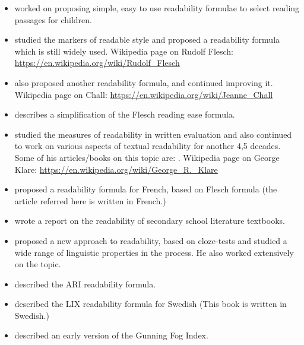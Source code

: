 \documentclass[a4paper,12pt]{report}
\begin{document}
\begin{itemize}
\item \cite{Lorge-39,Lorge-44,Thorndike.Lorge-44} worked on proposing simple, easy to use readability formulae to select reading passages for children.

\item \cite{Flesch-43,Flesch-48} studied the markers of readable style and proposed a readability formula which is still widely used. Wikipedia page on Rudolf Flesch: \url{https://en.wikipedia.org/wiki/Rudolf_Flesch}

\item \cite{Dale.Chall-48,Dale.Chall-48a} also proposed another readability formula, and continued improving it. Wikipedia page on Chall: \url{https://en.wikipedia.org/wiki/Jeanne_Chall}

\item \cite{Farr.Jenkins.ea-51} describes a simplification of the Flesch reading ease formula.

\item \cite{Klare-52} studied the measures of readability in written evaluation and also continued to work on various aspects of textual readability for another 4,5 decades. Some of his articles/books on this topic are: \cite{Klare.Mabry.ea-55a,Klare.Mabry.ea-55b,Klare.Nichols.ea-57,Klare-63,Klare-69,Klare-74,Klare-00,Klare-00a}. Wikipedia page on George Klare: \url{https://en.wikipedia.org/wiki/George_R._Klare}

\item \cite{Kandel.Moles-58} proposed a readability formula for French, based on Flesch formula (the article referred here is written in French.)

\item \cite{Aukerman-65} wrote a report on the readability of secondary school literature textbooks.

\item \cite{Bormuth-66} proposed a new approach to readability, based on cloze-tests and studied a wide range of linguistic properties in the process. He also worked extensively on the topic. 

\item \cite{Smith.Senter-67} described the ARI readability formula.

\item \cite{Bjornsson-68} described the LIX readability formula for Swedish (This book is written in Swedish.) 

\item \cite{Gunning-68} described an early version of the Gunning Fog Index. 


\end{itemize}
\end{document}
